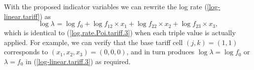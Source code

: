 \documentclass[12pt]{article}
\begin{document}
With the proposed indicator variables we can rewrite the log rate (\ref{log-linear.tariff}) as
\begin{equation}
\label{log-linear.tariff.3}
\log \lambda_{}= \log f_0+ \log f_{12}  \times x_1 + \log f_{22} \times x_2 +\log f_{23} \times x_3,
\end{equation} 
which is identical to (\ref{log.rate.Poi.tariff.3}) when each triple value is actually applied. For example, we can verify that the base tariff cell $(j,k)=(1,1)$ corresponds to $(x_1, x_2,x_3)=(0, 0, 0)$, and in turn produces $\log \lambda=\log f_0$ or $\lambda= f_0$ in (\ref{log-linear.tariff.3}) as required. \\%
%
\end{document}
